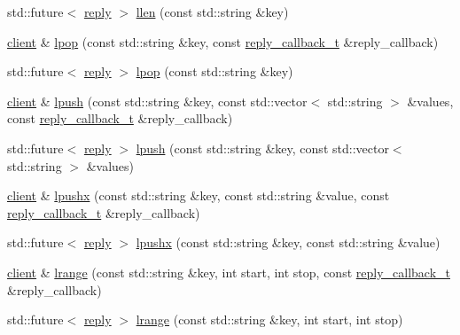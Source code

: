 \begin{DoxyCompactItemize}
\item 
std\+::future$<$ \hyperlink{classcpp__redis_1_1reply}{reply} $>$ \hyperlink{classcpp__redis_1_1client_a2890fccb9efd08b38195c8fb5fd1651e}{llen} (const std\+::string \&key)
\item 
\hyperlink{classcpp__redis_1_1client}{client} \& \hyperlink{classcpp__redis_1_1client_ad4060807b9b9aa330ad11dedd69e80b8}{lpop} (const std\+::string \&key, const \hyperlink{classcpp__redis_1_1client_a061a1140d36d2eaeda82b09a0bb3f9f2}{reply\+\_\+callback\+\_\+t} \&reply\+\_\+callback)
\item 
std\+::future$<$ \hyperlink{classcpp__redis_1_1reply}{reply} $>$ \hyperlink{classcpp__redis_1_1client_ab6ebbc7b2e6f43f2b5607a4b5471694e}{lpop} (const std\+::string \&key)
\item 
\hyperlink{classcpp__redis_1_1client}{client} \& \hyperlink{classcpp__redis_1_1client_a0dd04ea38709dd51ae5f39de62d01c70}{lpush} (const std\+::string \&key, const std\+::vector$<$ std\+::string $>$ \&values, const \hyperlink{classcpp__redis_1_1client_a061a1140d36d2eaeda82b09a0bb3f9f2}{reply\+\_\+callback\+\_\+t} \&reply\+\_\+callback)
\item 
std\+::future$<$ \hyperlink{classcpp__redis_1_1reply}{reply} $>$ \hyperlink{classcpp__redis_1_1client_ac5859a6b63200a4a79574187a7155feb}{lpush} (const std\+::string \&key, const std\+::vector$<$ std\+::string $>$ \&values)
\item 
\hyperlink{classcpp__redis_1_1client}{client} \& \hyperlink{classcpp__redis_1_1client_ab0a9a2b92f53f774ce4e345b42a403d0}{lpushx} (const std\+::string \&key, const std\+::string \&value, const \hyperlink{classcpp__redis_1_1client_a061a1140d36d2eaeda82b09a0bb3f9f2}{reply\+\_\+callback\+\_\+t} \&reply\+\_\+callback)
\item 
std\+::future$<$ \hyperlink{classcpp__redis_1_1reply}{reply} $>$ \hyperlink{classcpp__redis_1_1client_af9a3e05f5bd6d4ebb3138dc09f8d0d4e}{lpushx} (const std\+::string \&key, const std\+::string \&value)
\item 
\hyperlink{classcpp__redis_1_1client}{client} \& \hyperlink{classcpp__redis_1_1client_a9e85cce8555274f7bc706a13911b4579}{lrange} (const std\+::string \&key, int start, int stop, const \hyperlink{classcpp__redis_1_1client_a061a1140d36d2eaeda82b09a0bb3f9f2}{reply\+\_\+callback\+\_\+t} \&reply\+\_\+callback)
\item 
std\+::future$<$ \hyperlink{classcpp__redis_1_1reply}{reply} $>$ \hyperlink{classcpp__redis_1_1client_a1e7c8d099459af438cc4ed215afef066}{lrange} (const std\+::string \&key, int start, int stop)

\end{DoxyCompactItemize}
